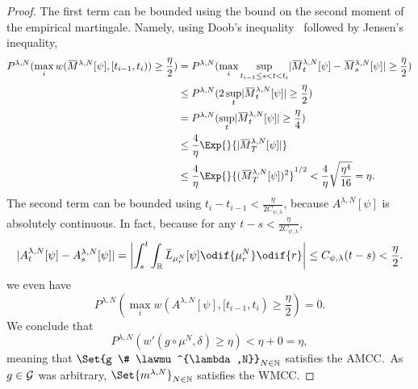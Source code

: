 \begin{proof}
  The first term can be bounded using the bound on the second moment of the empirical martingale.
  Namely, using Doob's inequality~\cite[64]{ethierMarkovProcessesCharacterization1985} followed by Jensen's inequality,
  \begin{equation}
    \begin{split}
      P^{\lambda, N}( \max_i w(\ol{M}^{\lambda, N}[\psi], [t_{i-1}, t_i)) \geq \frac{\eta}{2} )
       & = P^{\lambda, N}( \max_i \sup_{t_{i-1} \leq s < t < t_i} \abs{ \ol{M}_t^{\lambda, N}[\psi] - \ol{M}_s^{\lambda, N}[\psi] } \geq \frac{\eta}{2} ) \\
       & \leq P^{\lambda, N}( 2 \sup_{t} \abs{ \ol{M}_t^{\lambda, N}[\psi] } \geq \frac{\eta}{2} )                                                  \\
       & = P^{\lambda, N}( \sup_{t} \abs{ \ol{M}_t^{\lambda, N}[\psi] } \geq \frac{\eta}{4} )                                                       \\
       & \leq \frac{4}{\eta} \Exp{}{\abs{ \ol{M}_T^{\lambda, N}[\psi] }}                                                                            \\
       & \leq \frac{4}{\eta} \Exp{}{ ( \ol{M}_T^{\lambda, N}[\psi] )^2 }^{1/2}
      < \frac{4}{\eta} \sqrt{\frac{\eta^4}{16}}
      = \eta.
    \end{split}
  \end{equation}
  The second term can be bounded using \( t_i - t_{i-1} < \frac{\eta}{2C_{\psi, \lambda}} \), because \( A^{\lambda, N}[\psi] \) is absolutely continuous.
  In fact, because for any \( t - s < \frac{\eta}{2C_{\psi, \lambda}} \),
  \begin{equation}
    \abs{ A_t^{\lambda, N}[\psi] - A_s^{\lambda, N}[\psi] }
    = \abs*{ \int_s^t \int_{\potspace} \ol{L}_{\mu_r^N}[\psi] \odif{\mu_r^N} \odif{r} }
    \leq C_{\psi,\lambda} (t - s)
    < \frac{\eta}{2}.
  \end{equation}
  we even have
  \begin{equation}
    P^{\lambda, N}( \max_i w(A^{\lambda, N}[\psi], [t_{i-1}, t_i) \geq \frac{\eta}{2}) = 0.
  \end{equation}
  We conclude that
  \begin{equation}
    P^{\lambda, N} (w'(g \circ \mu^N, \delta) \geq \eta)
    < \eta + 0 = \eta,
  \end{equation}
  meaning that \( \Set{g \# \lawmu^{\lambda,N}}_{N \in \bN} \) satisfies the AMCC.\
  As \( g \in \mathcal{G} \) was arbitrary, \( \Set{\lawmu^{\lambda,N}}_{N \in \bN} \) satisfies the WMCC.


\end{proof}
